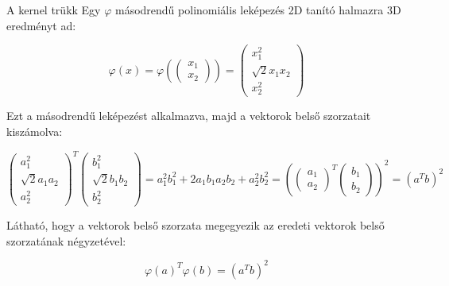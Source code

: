 \documentclass[english, aspectratio=169]{beamer}
\begin{document}
\begin{frame}{A kernel trükk}
Egy $\varphi$ másodrendű polinomiális leképezés 2D tanító halmazra 3D eredményt ad:
\begin{block}{}
\[
\varphi\left( x \right) = \varphi\left( \begin{pmatrix}
x_1 \\
x_2
\end{pmatrix} \right) = \begin{pmatrix}
x_1^2 \\
\sqrt{2} x_1 x_2 \\
x_2^2
\end{pmatrix}
\]
\end{block}
Ezt a másodrendű leképezést alkalmazva, majd a vektorok belső szorzatait kiszámolva:
\begin{block}{}
\vspace{-.5cm}
\[
\begin{pmatrix}
a_1^2 \\
\sqrt{2} a_1 a_2 \\
a_2^2
\end{pmatrix}^T \begin{pmatrix}
b_1^2 \\
\sqrt{2} b_1 b_2 \\
b_2^2
\end{pmatrix} = a_1^2 b_1^2 + 2 a_1 b_1 a_2 b_2 + a_2^2 b_2^2 = \left( \begin{pmatrix}
a_1 \\
a_2
\end{pmatrix}^T \begin{pmatrix}
b_1 \\
b_2
\end{pmatrix} \right)^2 = \left( a^T b \right)^2
\]
\end{block}
Látható, hogy a vektorok belső szorzata megegyezik az eredeti vektorok belső szorzatának négyzetével:
\begin{block}{}
\vspace{-.1cm}
\[
\varphi \left( a \right)^T \varphi \left( b \right) = \left( a^T b \right)^2
\]
\end{block}
\end{frame}
\end{document}
